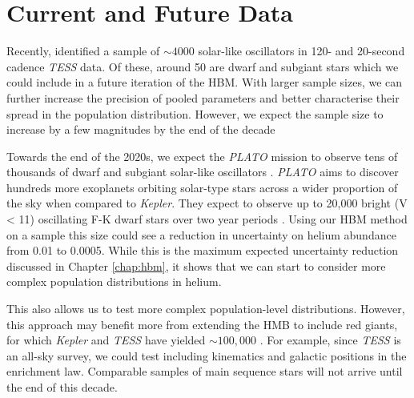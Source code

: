 \section{Current and Future Data}\label{sec:conc-future}

Recently, \citet{Hatt.Nielsen.ea2023} identified a sample of \(\sim 4000\) solar-like oscillators in 120- and 20-second cadence \emph{TESS} data. Of these, around 50  are dwarf and subgiant stars which we could include in a future iteration of the HBM. With larger sample sizes, we can further increase the precision of pooled parameters and better characterise their spread in the population distribution. However, we expect the sample size to increase by a few magnitudes by the end of the decade


Towards the end of the 2020s, we expect the \emph{PLATO} mission to observe tens of thousands of dwarf and subgiant solar-like oscillators \citep{Rauer.Catala.ea2014}. \emph{PLATO} aims to discover hundreds more exoplanets orbiting solar-type stars across a wider proportion of the sky when compared to \emph{Kepler}. They expect to observe up to 20,000 bright (V < 11) oscillating F-K dwarf stars over two year periods \citep{Goupil2017}. Using our HBM method on a sample this size could see a reduction in uncertainty on helium abundance from 0.01 to 0.0005. While this is the maximum expected uncertainty reduction discussed in Chapter \ref{chap:hbm}, it shows that we can start to consider more complex population distributions in helium.

This also allows us to test more complex population-level distributions.  However, this approach may benefit more from extending the HMB to include red giants, for which \emph{Kepler} and \emph{TESS} have yielded \(\sim 100,000\) \citep{Hon.Huber.ea2021,Yu.Huber.ea2018}. For example, since \emph{TESS} is an all-sky survey, we could test including kinematics and galactic positions in the enrichment law. Comparable samples of main sequence stars will not arrive until the end of this decade.


